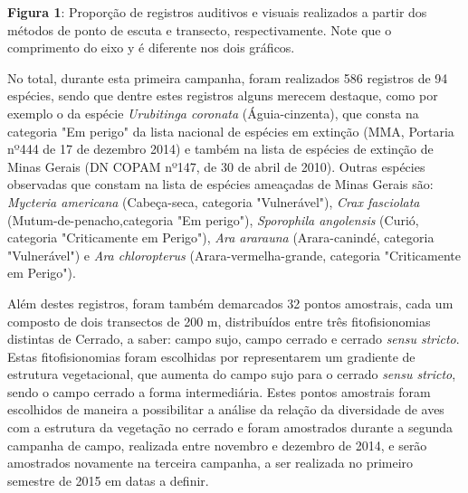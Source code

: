 \textbf{Figura 1}: Proporção de registros auditivos e visuais realizados a partir dos métodos de ponto de escuta e transecto, respectivamente. Note que o comprimento do eixo y é diferente nos dois gráficos.

No total, durante esta primeira campanha, foram realizados 586 registros de 94 espécies, sendo que dentre estes registros alguns merecem destaque, como por exemplo o da espécie \textit{Urubitinga coronata} (Águia-cinzenta), que consta na categoria "Em perigo" da lista nacional de espécies em extinção (MMA, Portaria nº444 de 17 de dezembro 2014) e também na lista de espécies de extinção de Minas Gerais (DN COPAM nº147, de 30 de abril de 2010). Outras espécies observadas que constam na lista de espécies ameaçadas de Minas Gerais são: \textit{Mycteria americana} (Cabeça-seca, categoria "Vulnerável"), \textit{Crax fasciolata} (Mutum-de-penacho,categoria "Em perigo"), \textit{Sporophila angolensis} (Curió, categoria "Criticamente em Perigo"), \textit{Ara ararauna}  (Arara-canindé, categoria "Vulnerável") e \textit{Ara chloropterus} (Arara-vermelha-grande, categoria "Criticamente em Perigo").

Além destes registros, foram também demarcados 32 pontos amostrais, cada um composto de dois transectos de 200 m, distribuídos entre três fitofisionomias distintas de Cerrado, a saber: campo sujo, campo cerrado e cerrado \textit{sensu stricto}. Estas fitofisionomias foram escolhidas por representarem um gradiente de estrutura vegetacional, que aumenta do campo sujo para o cerrado \textit{sensu stricto}, sendo o campo cerrado a forma intermediária. Estes pontos amostrais foram escolhidos de maneira a possibilitar a análise da relação da diversidade de aves com a estrutura da vegetação no cerrado e foram amostrados durante a segunda campanha de campo, realizada entre novembro e dezembro de 2014, e serão amostrados novamente na terceira campanha, a ser realizada no primeiro semestre de 2015 em datas a definir.

